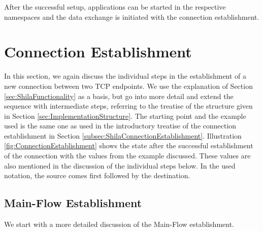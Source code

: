 After the successful setup, applications can be started in the respective namespaces and the data exchange is initiated with the connection establishment.

\section{Connection Establishment}
\label{sec:ImplementationConnectionEstablishment}

In this section, we again discuss the individual steps in the establishment of a new connection between two TCP endpoints. We use the explanation of Section \ref{sec:ShilaFunctionality} as a basis, but go into more detail and extend the sequence with intermediate steps, referring to the treatise of the structure given in Section \ref{sec:ImplementationStructure}. The starting point and the example used is the same one as used in the introductory treatise of the connection establishment in Section \ref{subsec:ShilaConnectionEstablishment}. Illustration \ref{fig:ConnectionEstablishment} shows the state after the successful establishment of the connection with the values from the example discussed. These values are also mentioned in the discussion of the individual steps below. In the used notation, the source comes first followed by the destination.

\subsection*{Main-Flow Establishment}

We start with a more detailed discussion of the Main-Flow establishment. 

